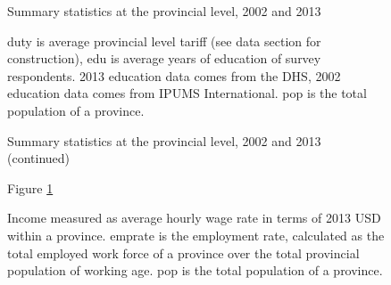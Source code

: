 \documentclass[12pt]{article}
\begin{document}
\begin{figure}[H]
\begin{center}
Summary statistics at the provincial level, 2002 and 2013

\caption{\label{fig:Summary 2}}
\end{center}
duty is average provincial level tariff (see data
section for construction), edu is average years of education of survey respondents. 
2013 education data comes from the DHS, 2002 education data comes
from IPUMS International. pop is the total population of a province.
\end{figure}

\begin{figure}[H]
\begin{center}
Summary statistics at the provincial level, 2002 and 2013 (continued)

Figure \ref{fig:Summary 2}
\end{center}
Income measured
as average hourly wage rate in terms of 2013 USD within a province.
emprate is the employment rate, calculated as the total employed work force of a province
over the total provincial population of working age.
pop is the total population of a province.
\end{figure}
\end{document}
